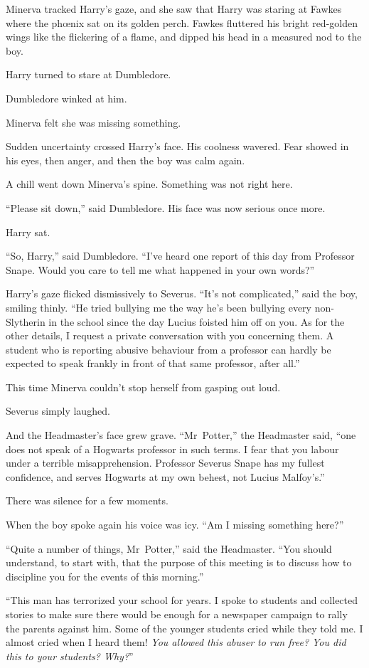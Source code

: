 Minerva tracked Harry’s gaze, and she saw that Harry was staring at Fawkes where the phœnix sat on its golden perch. Fawkes fluttered his bright red-golden wings like the flickering of a flame, and dipped his head in a measured nod to the boy.

Harry turned to stare at Dumbledore.

Dumbledore winked at him.

Minerva felt she was missing something.

Sudden uncertainty crossed Harry’s face. His coolness wavered. Fear showed in his eyes, then anger, and then the boy was calm again.

A chill went down Minerva’s spine. Something was not right here.

“Please sit down,” said Dumbledore. His face was now serious once more.

Harry sat.

“So, Harry,” said Dumbledore. “I’ve heard one report of this day from Professor Snape. Would you care to tell me what happened in your own words?”

Harry’s gaze flicked dismissively to Severus. “It’s not complicated,” said the boy, smiling thinly. “He tried bullying me the way he’s been bullying every non-Slytherin in the school since the day Lucius foisted him off on you. As for the other details, I request a private conversation with you concerning them. A student who is reporting abusive behaviour from a professor can hardly be expected to speak frankly in front of that same professor, after all.”

This time Minerva couldn’t stop herself from gasping out loud.

Severus simply laughed.

And the Headmaster’s face grew grave. “Mr~Potter,” the Headmaster said, “one does not speak of a Hogwarts professor in such terms. I fear that you labour under a terrible misapprehension. Professor Severus Snape has my fullest confidence, and serves Hogwarts at my own behest, not Lucius Malfoy’s.”

There was silence for a few moments.

When the boy spoke again his voice was icy. “Am I missing something here?”

“Quite a number of things, Mr~Potter,” said the Headmaster. “You should understand, to start with, that the purpose of this meeting is to discuss how to discipline you for the events of this morning.”

“This man has terrorized your school for years. I spoke to students and collected stories to make sure there would be enough for a newspaper campaign to rally the parents against him. Some of the younger students cried while they told me. I almost cried when I heard them! \emph{You allowed this abuser to run free? You did this to your students? Why?}”

